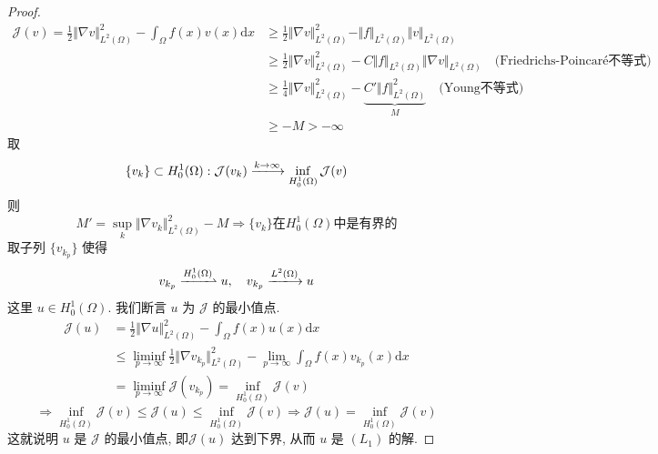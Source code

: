 \documentclass[11pt]{ctexart}[UTF8]
\begin{document}
\begin{proof}
    \begin{equation*}
        \begin{aligned}
            \mathcal{J}(v) = \frac{1}{2}\Vert \nabla v \Vert_{L^2(\Omega)}^2 - \int_{\Omega} f(x) v(x) \mathrm{d}x &\geq \frac{1}{2}\Vert \nabla v \Vert_{L^2(\Omega)}^2 - \Vert f \Vert_{L^2(\Omega)}\Vert v \Vert_{L^2(\Omega)}\\
            &\geq  \frac{1}{2}\Vert \nabla v \Vert_{L^2(\Omega)}^2 - C\Vert f \Vert_{L^2(\Omega)}\Vert \nabla v \Vert_{L^2(\Omega)} \quad \text{(Friedrichs-Poincaré不等式)}\\
            &\geq \frac{1}{4}\Vert \nabla v \Vert_{L^2(\Omega)}^2 - \underbrace{C'\Vert f \Vert_{L^2(\Omega)}^2}_{M} \quad \text{(Young不等式)}\\
            &\geq -M > -\infty
        \end{aligned}
    \end{equation*}
    取 $$\{ v_k \} \subset H_{0}^{1}(\Omega) : \mathcal{J}(v_k) \xlongrightarrow{k \to \infty} \inf\limits_{H_{0}^{1}(\Omega)} \mathcal{J}(v)$$
    则
    \begin{equation*}
        M' = \sup\limits_{k} \Vert \nabla v_k \Vert_{L^2(\Omega)}^2 - M \Longrightarrow \{ v_{k} \} \text{在} H_{0}^{1}(\Omega) \text{中是有界的}
    \end{equation*}
    取子列 $\{ v_{k_{p}} \}$ 使得
    \begin{equation*}
        v_{k_p} \xrightharpoonup{H_{0}^{1}(\Omega)}  u, \quad v_{k_p} \xlongrightarrow{L^2(\Omega)} u
    \end{equation*}
    这里 $u \in H_{0}^{1}(\Omega)$. 我们断言 $u$ 为 $\mathcal{J}$ 的最小值点.
    \begin{equation*}
        \begin{aligned}
            \mathcal{J}(u)  &= \frac{1}{2}\Vert \nabla u \Vert_{L^2(\Omega)}^2 - \int_{\Omega} f(x) u(x) \mathrm{d}x\\
                            &\leq \liminf\limits_{p \to \infty} \frac{1}{2}\Vert \nabla v_{k_p} \Vert_{L^2(\Omega)}^2 - \lim\limits_{p \to \infty} \int_{\Omega} f(x) v_{k_p}(x) \mathrm{d}x\\
                            &= \liminf\limits_{p \to \infty} \mathcal{J}(v_{k_p}) = \inf\limits_{H_{0}^{1}(\Omega)} \mathcal{J}(v)
        \end{aligned}
    \end{equation*} 
    \begin{equation*}
        \Longrightarrow \inf\limits_{H_{0}^{1}(\Omega)} \mathcal{J}(v) \leq \mathcal{J}(u) \leq \inf\limits_{H_{0}^{1}(\Omega)} \mathcal{J}(v) \Longrightarrow \mathcal{J}(u) = \inf\limits_{H_{0}^{1}(\Omega)} \mathcal{J}(v)
    \end{equation*}
    这就说明 $u$ 是 $\mathcal{J}$ 的最小值点, 即$\mathcal{J}(u)$ 达到下界, 从而 $u$ 是 $(L_1)$ 的解.
\end{proof}
\end{document}
